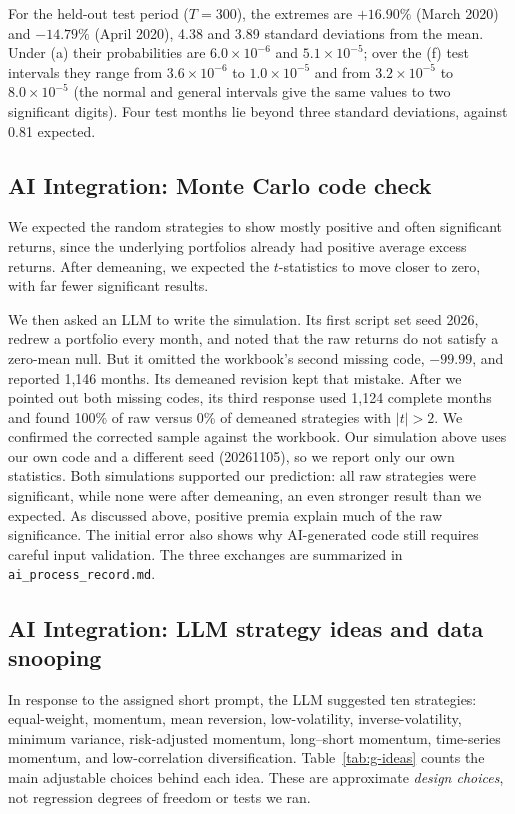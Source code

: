 For the held-out test period ($T=300$), the extremes are $+16.90\%$ (March
2020) and $-14.79\%$ (April 2020), 4.38 and 3.89 standard deviations from the
mean. Under (a) their probabilities are $6.0\times10^{-6}$ and
$5.1\times10^{-5}$; over the (f) test intervals they range from
$3.6\times10^{-6}$ to $1.0\times10^{-5}$ and from $3.2\times10^{-5}$ to
$8.0\times10^{-5}$ (the normal and general intervals give the same values to
two significant digits). Four test months lie beyond three standard deviations,
against 0.81 expected.

\subsection*{AI Integration: Monte Carlo code check}

We expected the random strategies to show mostly positive and often
significant returns, since the underlying portfolios already had positive
average excess returns. After demeaning, we expected the $t$-statistics to move
closer to zero, with far fewer significant results.

We then asked an LLM to write the simulation. Its first script set seed 2026,
redrew a portfolio every month, and noted that the raw returns do not satisfy
a zero-mean null. But it omitted the workbook's second missing
code, $-99.99$, and reported 1,146 months. Its demeaned revision kept that
mistake. After we pointed out both missing codes, its third response used
1,124 complete months and found 100\% of raw versus 0\% of demeaned strategies
with $|t|>2$. We confirmed the corrected sample against the workbook. Our
simulation above uses our own code and a different seed (20261105), so we
report only our own statistics. Both simulations supported our prediction:
all raw strategies were significant, while none were after demeaning, an even
stronger result than we expected. As discussed above, positive premia explain
much of the raw significance. The initial error also shows why AI-generated
code still requires careful input validation. The three exchanges are summarized in
\texttt{ai\_process\_record.md}.

\subsection*{AI Integration: LLM strategy ideas and data snooping}

In response to the assigned short prompt, the LLM suggested ten strategies:
equal-weight, momentum, mean reversion, low-volatility, inverse-volatility,
minimum variance, risk-adjusted momentum, long--short momentum, time-series
momentum, and low-correlation diversification. Table~\ref{tab:g-ideas}
counts the main adjustable choices behind each idea. These are approximate
\emph{design choices}, not regression degrees of freedom or tests we ran.

